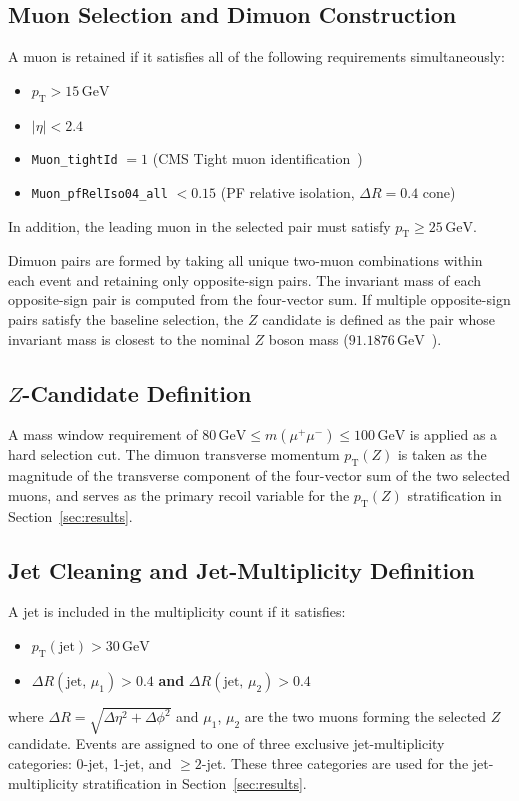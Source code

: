 \documentclass[a4paper,11pt]{article}
\newcommand{\pTZ}{\ensuremath{p_{\mathrm{T}}(Z)}\xspace}
\begin{document}
\subsection{Muon Selection and Dimuon Construction}

A muon is retained if it satisfies all of the following requirements
simultaneously:
\begin{itemize}
  \item $p_{\mathrm{T}} > 15\,\mathrm{GeV}$
  \item $|\eta| < 2.4$
  \item \texttt{Muon\_tightId} $= 1$ (CMS Tight muon identification~\cite{CMS:Muon2018})
  \item \texttt{Muon\_pfRelIso04\_all} $< 0.15$ (PF relative isolation,
    $\Delta R = 0.4$ cone)
\end{itemize}
In addition, the leading muon in the selected pair must satisfy
$p_{\mathrm{T}} \geq 25\,\mathrm{GeV}$.

Dimuon pairs are formed by taking all unique two-muon combinations within
each event and retaining only opposite-sign pairs.
The invariant mass of each opposite-sign pair is computed from the
four-vector sum.
If multiple opposite-sign pairs satisfy the baseline selection, the $Z$
candidate is defined as the pair whose invariant mass is closest to the
nominal $Z$ boson mass ($91.1876\,\mathrm{GeV}$~\cite{PDG:2020}).

\subsection{$Z$-Candidate Definition}

A mass window requirement of $80\,\mathrm{GeV} \leq m(\mu^+\mu^-) \leq
100\,\mathrm{GeV}$ is applied as a hard selection cut.
The dimuon transverse momentum \pTZ is taken as the magnitude of the
transverse component of the four-vector sum of the two selected muons, and
serves as the primary recoil variable for the \pTZ stratification in
Section~\ref{sec:results}.

\subsection{Jet Cleaning and Jet-Multiplicity Definition}

A jet is included in the multiplicity count if it satisfies:
\begin{itemize}
  \item $p_{\mathrm{T}}(\text{jet}) > 30\,\mathrm{GeV}$
  \item $\Delta R(\text{jet},\,\mu_1) > 0.4$ \textbf{and}
    $\Delta R(\text{jet},\,\mu_2) > 0.4$
\end{itemize}
where $\Delta R = \sqrt{\Delta\eta^2 + \Delta\phi^2}$ and $\mu_1$,
$\mu_2$ are the two muons forming the selected $Z$ candidate.
Events are assigned to one of three exclusive jet-multiplicity categories:
0-jet, 1-jet, and $\geq\!2$-jet.
These three categories are used for the jet-multiplicity stratification in
Section~\ref{sec:results}.
\end{document}
